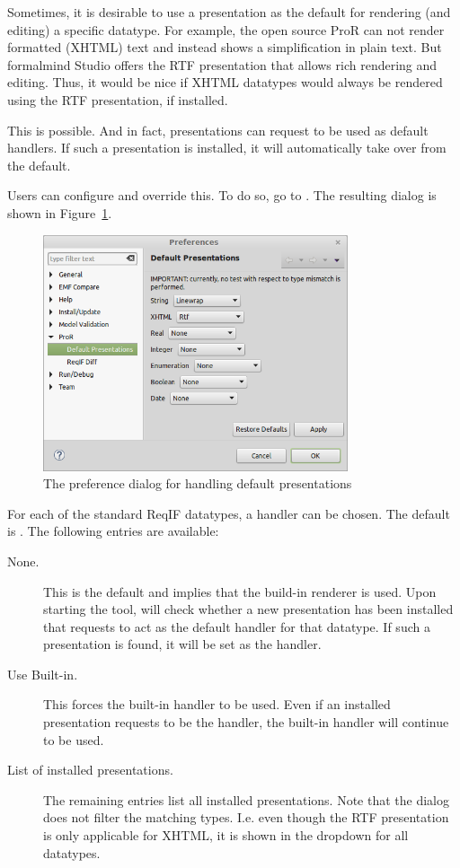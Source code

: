 Sometimes, it is desirable to use a presentation as the default for rendering (and editing) a specific datatype.  For example, the open source ProR can not render formatted (XHTML) text and instead shows a simplification in plain text.  But formalmind Studio offers the RTF presentation that allows rich rendering and editing.  Thus, it would be nice if XHTML datatypes would always be rendered using the RTF presentation, if installed.

This is possible.  And in fact, presentations can request to be used as default handlers.  If such a presentation is installed, it will automatically take over from the default.

Users can configure and override this.  To do so, go to .  The resulting dialog is shown in Figure~\ref{fig:default-handlers}.

\begin{figure}
  \centering
  \includegraphics[width=0.8\textwidth]{../rmf-images/default-handlers.png}
  \caption{The preference dialog for handling default presentations}
  \label{fig:default-handlers}
\end{figure}

For each of the standard ReqIF datatypes, a handler can be chosen.  The default is .  The following entries are available:

\begin{description}
\item[None.] This is the default and implies that the build-in renderer is used.   Upon starting the tool, \pror{} will check whether a new presentation has been installed that requests to act as the default handler for that datatype.  If such a presentation is found, it will be set as the handler.
\item[Use Built-in.] This forces the built-in handler to be used.  Even if an installed presentation requests to be the handler, the built-in handler will continue to be used.
\item[List of installed presentations.] The remaining entries list all installed presentations.  Note that the dialog does not filter the matching types.  I.e. even though the RTF presentation is only applicable for XHTML, it is shown in the dropdown for all datatypes.
\end{description}

